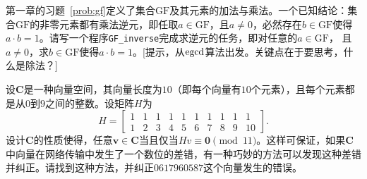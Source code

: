 \begin{problemset}
  \item 第一章的习题~\ref{prob:gf}定义了集合$\mathrm{GF}$及其元素的加法与乘法。一个已知结论：集合$\mathrm{GF}$的非零元素都有乘法逆元，即任取$a \in \mathrm{GF}$，且$a \ne 0$，必然存在$b \in \mathrm{GF}$使得$a\cdot b = 1$。请写一个程序\texttt{GF\_inverse}完成求逆元的任务，即对任意的$a \in \mathrm{GF}$，
    且 $a \ne 0$，求$b \in\mathrm{GF}$使得$a \cdot b = 1$。[提示，从$\operatorname{egcd}$算法出发。关键点在于要思考，什么是除法？]
    
  \item 设$\mathbf{C}$是一种向量空间，其向量长度为$10$（即每个向量有$10$个元素），且每个元素都是从$0$到$9$之间的整数。设矩阵$H$为
  \[
  H =
  \begin{bmatrix}
  	1 & 1 & 1 & 1 & 1 & 1 & 1 & 1 & 1 & 1 \\
  	1 & 2 & 3 & 4 & 5 & 6 & 7 & 8 & 9 & 10 
  \end{bmatrix}.
  \]
  设计$\mathbf{C}$的性质使得，任意$\mathbf{v} \in \mathbf{C}$当且仅当$H v \equiv \mathbf{0} \pmod{11}$。这样可保证，如果$\mathbf{C}$中向量在网络传输中发生了一个数位的差错，有一种巧妙的方法可以发现这种差错并纠正。请找到这种方法，并纠正$0617960587$这个向量发生的错误。
\end{problemset}
